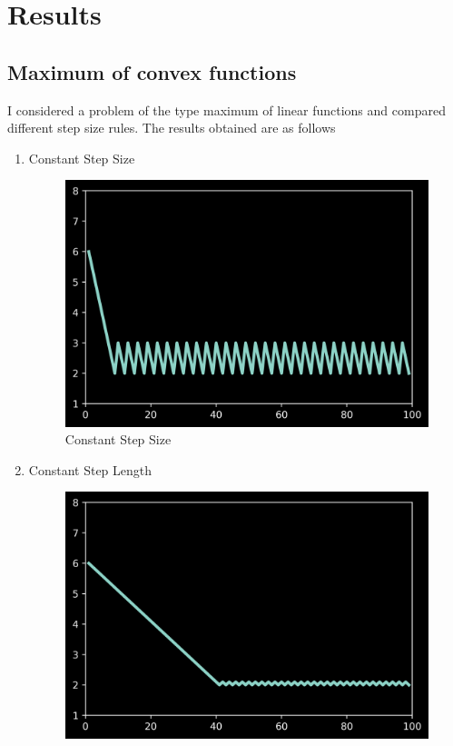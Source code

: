 \documentclass[twoside,twocolumn]{article}
\begin{document}
\section{Results}
\subsection{Maximum of convex functions}
I considered a problem of the type maximum of linear functions and compared different step size rules. The results obtained are as follows
\begin{enumerate}
    \item Constant Step Size
    \begin{figure}[H]
        \centering
        \includegraphics[scale=0.5]{../../step/constantstepsize.png}
        \caption{Constant Step Size}
        \label{constantstepsize}
    \end{figure}
    \item Constant Step Length
    \begin{figure}[H]
        \centering
        \includegraphics[scale=0.5]{../../step/constantsteplength.png}

\end{figure}
\end{enumerate}
\end{document}
